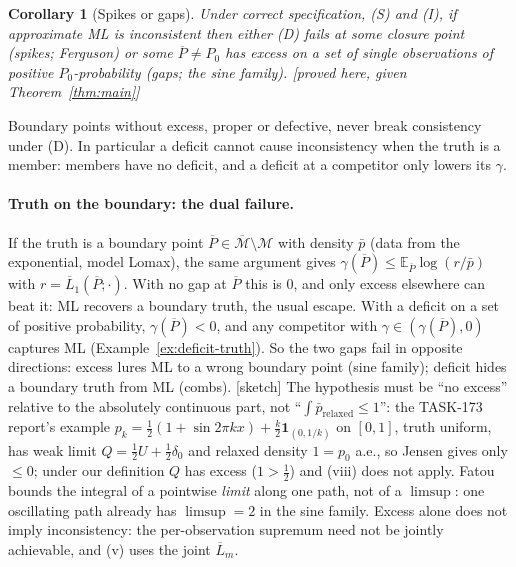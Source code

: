 \documentclass[11pt]{article}
\newcommand{\E}{\mathbb E}
\newcommand{\cM}{\mathcal M}
\newcommand{\bM}{\overline{\mathcal M}}
\newcommand{\bP}{\overline P}
\newcommand{\bL}{\overline L}
\newcommand{\status}[1]{\textsf{[#1]}}
\newtheorem{corollary}[theorem]{Corollary}
\theoremstyle{definition}
\theoremstyle{remark}
\begin{document}
\begin{corollary}[Spikes or gaps]\label{cor:spikes-gaps}
Under correct specification, (S) and (I), if approximate ML is inconsistent
then either (D) fails at some closure point (spikes; Ferguson) or some
$\bP\ne P_0$ has excess on a set of single observations of positive
$P_0$-probability (gaps; the sine family). \status{proved here, given
Theorem~\ref{thm:main}}
\end{corollary}

Boundary points without excess, proper or defective, never break
consistency under (D). In particular a deficit cannot cause inconsistency
when the truth is a member: members have no deficit, and a deficit at a
competitor only lowers its $\gamma$.

\paragraph{Truth on the boundary: the dual failure.} If the truth is a
boundary point $\bP\in\bM\setminus\cM$ with density $\bar p$ (data from the
exponential, model Lomax), the same argument gives
$\gamma(\bP)\le\E_{\bP}\log(r/\bar p)$ with $r=\bL_1(\bP;\cdot)$. With no gap
at $\bP$ this is $0$, and only excess elsewhere can beat it: ML recovers a
boundary truth, the usual escape. With a deficit on a set of positive
probability, $\gamma(\bP)<0$, and any competitor with
$\gamma\in(\gamma(\bP),0)$ captures ML (Example~\ref{ex:deficit-truth}).
So the two gaps fail in opposite directions: excess lures ML to a wrong
boundary point (sine family); deficit hides a boundary truth from ML
(combs). \status{sketch} The hypothesis must be ``no excess'' relative to the
absolutely continuous part, not ``$\int\bar p_{\mathrm{relaxed}}\le1$'': the
TASK-173 report's example $p_k=\frac12(1+\sin2\pi kx)+\frac k2\mathbf
1_{(0,1/k)}$ on $[0,1]$, truth uniform, has weak limit
$Q=\frac12U+\frac12\delta_0$ and relaxed density $1=p_0$ a.e., so Jensen gives
only $\le0$; under our definition $Q$ has excess ($1>\frac12$) and (viii)
does not apply. Fatou bounds the integral of a pointwise \emph{limit} along
one path, not of a $\limsup$: one oscillating path already has $\limsup=2$
in the sine family. Excess alone does not imply inconsistency: the per-observation
supremum need not be jointly achievable, and (v) uses the joint
$\bL_m$.
\end{document}
